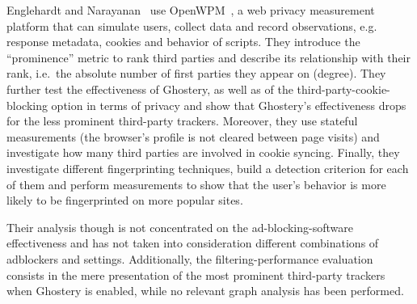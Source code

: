 Englehardt and Narayanan~\cite{englehardt} use OpenWPM~\cite{englehardt_open_wpm}, a web privacy measurement platform that can simulate users, collect data and record observations, e.g. response metadata, cookies and behavior of scripts. They introduce the ``prominence'' metric to rank third parties
and describe its relationship with their rank, i.e.\ the absolute number of first parties they appear on (degree). They further test the effectiveness of Ghostery, as well as of the third-party-cookie-blocking option in terms of privacy and show that Ghostery's effectiveness drops for the less prominent third-party trackers. Moreover, they use stateful measurements (the browser's profile is not cleared between page visits) and investigate how many third parties are involved in cookie syncing.
Finally, they investigate different fingerprinting techniques, build a detection criterion for each of them and perform measurements to show that the user's behavior is more likely to be fingerprinted on more popular sites.

Their analysis though is not concentrated on the ad-blocking-software effectiveness and has not taken into consideration different combinations of adblockers and settings. Additionally, the filtering-performance evaluation consists in the mere presentation of the most prominent third-party trackers when Ghostery is enabled, while no relevant graph analysis has been performed.
